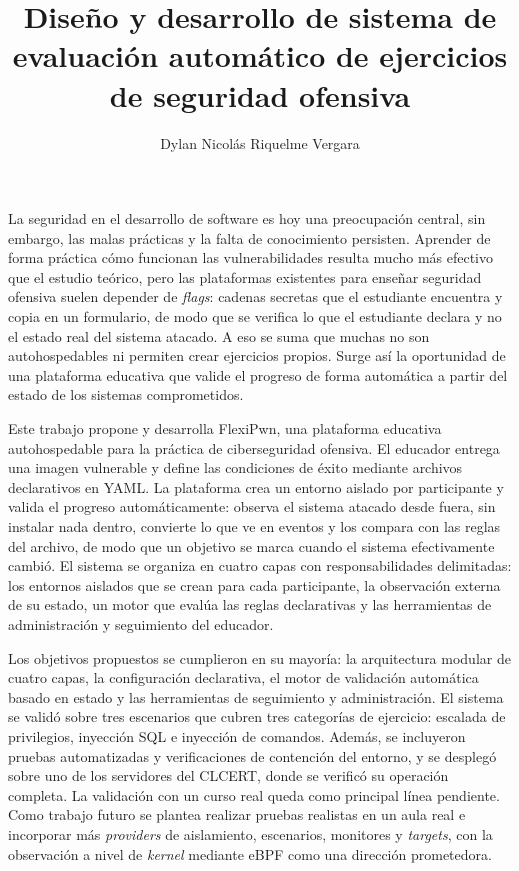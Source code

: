 \documentclass{umemoria}
\author{Dylan Nicolás Riquelme Vergara}
\title{Diseño y desarrollo de sistema de evaluación automático de ejercicios de seguridad ofensiva}
\begin{document}
\frontmatter
\maketitle

\begin{resumen}
La seguridad en el desarrollo de software es hoy una preocupación central, sin
embargo, las malas prácticas y la falta de conocimiento persisten. Aprender de
forma práctica cómo funcionan las vulnerabilidades resulta mucho más efectivo
que el estudio teórico, pero las plataformas existentes para enseñar seguridad
ofensiva suelen depender de \textit{flags}: cadenas secretas que el estudiante
encuentra y copia en un formulario, de modo que se verifica lo que el estudiante
declara y no el estado real del sistema atacado. A eso se suma que muchas no son
autohospedables ni permiten crear ejercicios propios. Surge así la oportunidad
de una plataforma educativa que valide el progreso de forma automática a partir
del estado de los sistemas comprometidos.

Este trabajo propone y desarrolla FlexiPwn, una plataforma educativa
autohospedable para la práctica de ciberseguridad ofensiva. El educador entrega
una imagen vulnerable y define las condiciones de éxito mediante archivos
declarativos en YAML. La plataforma crea un entorno aislado por participante y
valida el progreso automáticamente: observa el sistema atacado desde fuera, sin
instalar nada dentro, convierte lo que ve en eventos y los compara con las
reglas del archivo, de modo que un objetivo se marca cuando el sistema
efectivamente cambió. El sistema se organiza en cuatro capas con
responsabilidades delimitadas: los entornos aislados que se crean para cada
participante, la observación externa de su estado, un motor que evalúa las
reglas declarativas y las herramientas de administración y seguimiento del
educador.

Los objetivos propuestos se cumplieron en su mayoría: la arquitectura modular de
cuatro capas, la configuración declarativa, el motor de validación automática
basado en estado y las herramientas de seguimiento y administración. El sistema
se validó sobre tres escenarios que cubren tres categorías de ejercicio: escalada 
de privilegios, inyección SQL e inyección de comandos. Además, se incluyeron pruebas 
automatizadas y verificaciones de contención del entorno, y se desplegó sobre
uno de los servidores del CLCERT, donde se verificó su operación completa. La
validación con un curso real queda como principal línea pendiente.
Como trabajo futuro se plantea realizar pruebas realistas en un aula real e 
incorporar más \textit{providers} de aislamiento, escenarios, monitores y 
\textit{targets}, con la observación a nivel de \textit{kernel} mediante eBPF como una dirección prometedora.
\end{resumen}
\end{document}
